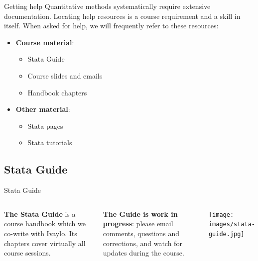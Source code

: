 \documentclass{beamer}
\begin{document}
	\begin{frame}[t]{Getting help}
		Quantitative methods systematically require extensive documentation. Locating help resources is a course requirement and a skill in itself. When asked for help, we will frequently refer to these resources:

		\begin{itemize}
			\item \textbf{Course material}:

			\begin{itemize}
				\item Stata Guide
				\item Course slides and emails
				\item Handbook chapters
			\end{itemize}			
			
			
			\item \textbf{Other material}:
			
			\begin{itemize}
				\item Stata  pages
				\item Stata tutorials
			\end{itemize}
			
		\end{itemize}

	\end{frame}

	\subsection{Stata Guide}

	\begin{frame}[t]{Stata Guide}
		\begin{columns}[T]
			\textbf{The Stata Guide} is a course handbook which we co-write with Ivaylo. Its chapters cover virtually all course sessions.\vspace{1em}
			
			\textbf{The Guide is work in progress}: please email comments, questions and corrections, and watch for updates during the course.
			
			\texttt{[image: images/stata-guide.jpg]}
		\end{columns}
	\end{frame}
				
\end{document}
